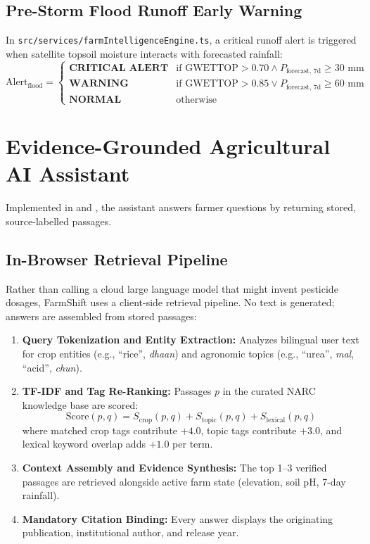 \documentclass[11pt,a4paper]{report}
\begin{document}
\section{Pre-Storm Flood Runoff Early Warning}
In \texttt{src/services/farmIntelligenceEngine.ts}, a critical runoff alert is triggered when satellite topsoil moisture interacts with forecasted rainfall:
\begin{equation}
  \text{Alert}_{\text{flood}} = \begin{cases}
    \textbf{CRITICAL ALERT} & \text{if } \text{GWETTOP} > 0.70 \land P_{\text{forecast, 7d}} \ge 30\text{ mm} \\
    \textbf{WARNING} & \text{if } \text{GWETTOP} > 0.85 \lor P_{\text{forecast, 7d}} \ge 60\text{ mm} \\
    \textbf{NORMAL} & \text{otherwise}
  \end{cases}
\end{equation}

\chapter{Evidence-Grounded Agricultural AI Assistant}

Implemented in  and , the assistant answers farmer questions by returning stored, source-labelled passages.

\section{In-Browser Retrieval Pipeline}
Rather than calling a cloud large language model that might invent pesticide dosages, FarmShift uses a client-side retrieval pipeline. No text is generated; answers are assembled from stored passages:
\begin{enumerate}
  \item \textbf{Query Tokenization and Entity Extraction:} Analyzes bilingual user text for crop entities (e.g., ``rice'', \textit{dhaan}) and agronomic topics (e.g., ``urea'', \textit{mal}, ``acid'', \textit{chun}).
  \item \textbf{TF-IDF and Tag Re-Ranking:} Passages $p$ in the curated NARC knowledge base are scored:
  \begin{equation}
    \text{Score}(p, q) = S_{\text{crop}}(p, q) + S_{\text{topic}}(p, q) + S_{\text{lexical}}(p, q)
  \end{equation}
  where matched crop tags contribute $+4.0$, topic tags contribute $+3.0$, and lexical keyword overlap adds $+1.0$ per term.
  \item \textbf{Context Assembly and Evidence Synthesis:} The top 1--3 verified passages are retrieved alongside active farm state (elevation, soil pH, 7-day rainfall).
  \item \textbf{Mandatory Citation Binding:} Every answer displays the originating publication, institutional author, and release year.
\end{enumerate}
\end{document}
